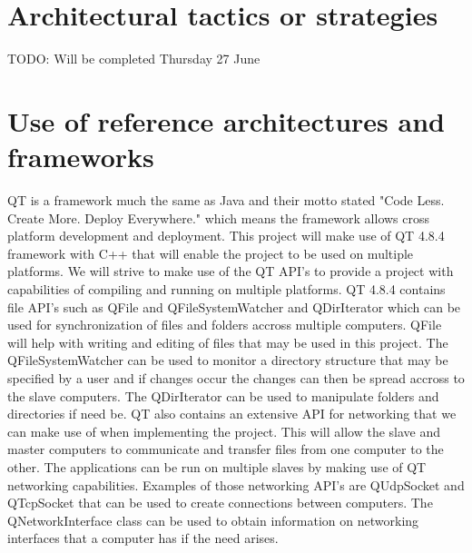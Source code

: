 \documentclass[a4paper,12pt,final]{article}
\begin{document}
\section{Architectural tactics or strategies}
TODO: Will be completed Thursday 27 June

\section{Use of reference architectures and\\ frameworks}
QT is a framework much the same as Java and their motto stated "Code Less. Create More. Deploy Everywhere." which means the framework allows cross platform development and deployment. This project will make use of QT 4.8.4 framework with C++ that will enable the project to be used on multiple platforms. We will strive to make use of the QT API's to provide a project with capabilities of compiling and running on multiple platforms.
\vspace{6pt}\newline
QT 4.8.4 contains file API's such as QFile and QFileSystemWatcher and QDirIterator which can be used for synchronization of files and folders accross multiple computers. QFile will help with writing and editing of files that may be used in this project. The QFileSystemWatcher can be used to monitor a directory structure that may be specified by a user and if changes occur the changes can then be spread accross to the slave computers. The QDirIterator can be used to manipulate folders and directories if need be.
\vspace{6pt}\newline
QT also contains an extensive API for networking that we can make use of when implementing the project. This will allow the slave and master computers to communicate and transfer files from one computer to the other. The applications can be run on multiple slaves by making use of QT networking capabilities. Examples of those networking API's are QUdpSocket and QTcpSocket that can be used to create connections between computers. The QNetworkInterface class can be used to obtain information on networking interfaces that a computer has if the need arises.
\end{document}
